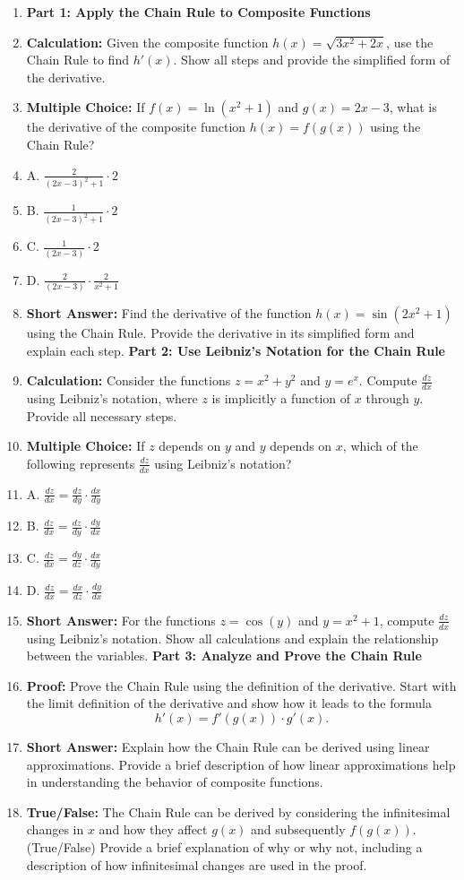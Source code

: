 \begin{enumerate}
    \item \textbf{Part 1: Apply the Chain Rule to Composite Functions}
    \item \textbf{Calculation:} Given the composite function $h(x) = \sqrt{3x^2 + 2x}$, use the Chain Rule to find $h'(x)$. Show all steps and provide the simplified form of the derivative.
    \item \textbf{Multiple Choice:} If $f(x) = \ln(x^2 + 1)$ and $g(x) = 2x - 3$, what is the derivative of the composite function $h(x) = f(g(x))$ using the Chain Rule?
    \item A. $\frac{2}{(2x - 3)^2 + 1} \cdot 2$
    \item B. $\frac{1}{(2x - 3)^2 + 1} \cdot 2$
    \item C. $\frac{1}{(2x - 3)} \cdot 2$
    \item D. $\frac{2}{(2x - 3)} \cdot \frac{2}{x^2 + 1}$
    \item \textbf{Short Answer:} Find the derivative of the function $h(x) = \sin(2x^2 + 1)$ using the Chain Rule. Provide the derivative in its simplified form and explain each step. \textbf{Part 2: Use Leibniz's Notation for the Chain Rule}
    \item \textbf{Calculation:} Consider the functions $z = x^2 + y^2$ and $y = e^x$. Compute $\frac{dz}{dx}$ using Leibniz's notation, where $z$ is implicitly a function of $x$ through $y$. Provide all necessary steps.
    \item \textbf{Multiple Choice:} If $z$ depends on $y$ and $y$ depends on $x$, which of the following represents $\frac{dz}{dx}$ using Leibniz's notation?
    \item A. $\frac{dz}{dx} = \frac{dz}{dy} \cdot \frac{dx}{dy}$
    \item B. $\frac{dz}{dx} = \frac{dz}{dy} \cdot \frac{dy}{dx}$
    \item C. $\frac{dz}{dx} = \frac{dy}{dz} \cdot \frac{dx}{dy}$
    \item D. $\frac{dz}{dx} = \frac{dx}{dz} \cdot \frac{dy}{dx}$
    \item \textbf{Short Answer:} For the functions $z = \cos(y)$ and $y = x^2 + 1$, compute $\frac{dz}{dx}$ using Leibniz's notation. Show all calculations and explain the relationship between the variables. \textbf{Part 3: Analyze and Prove the Chain Rule}
    \item \textbf{Proof:} Prove the Chain Rule using the definition of the derivative. Start with the limit definition of the derivative and show how it leads to the formula $$h'(x) = f'(g(x)) \cdot g'(x).$$
    \item \textbf{Short Answer:} Explain how the Chain Rule can be derived using linear approximations. Provide a brief description of how linear approximations help in understanding the behavior of composite functions.
    \item \textbf{True/False:} The Chain Rule can be derived by considering the infinitesimal changes in $x$ and how they affect $g(x)$ and subsequently $f(g(x))$. (True/False) Provide a brief explanation of why or why not, including a description of how infinitesimal changes are used in the proof.
\end{enumerate}

